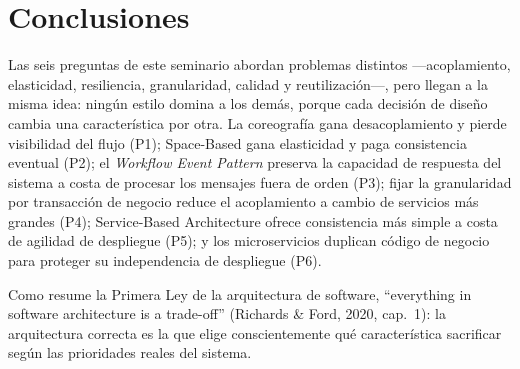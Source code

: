 
\section*{Conclusiones}

Las seis preguntas de este seminario abordan problemas distintos
—acoplamiento, elasticidad, resiliencia, granularidad, calidad y
reutilización—, pero llegan a la misma idea: ningún estilo domina a los
demás, porque cada decisión de diseño cambia una característica por otra. La
coreografía gana desacoplamiento y pierde visibilidad del flujo (P1);
Space-Based gana elasticidad y paga consistencia eventual (P2); el
\emph{Workflow Event Pattern} preserva la capacidad de respuesta del sistema
a costa de procesar los mensajes fuera de orden (P3); fijar la granularidad
por transacción de negocio reduce el acoplamiento a cambio de servicios más
grandes (P4); Service-Based Architecture ofrece consistencia más simple a
costa de agilidad de despliegue (P5); y los microservicios duplican código de
negocio para proteger su independencia de despliegue (P6).

Como resume la Primera Ley de la arquitectura de software, ``everything in
software architecture is a trade-off'' (Richards \& Ford, 2020, cap.~1): la
arquitectura correcta es la que elige conscientemente qué característica
sacrificar según las prioridades reales del sistema.
